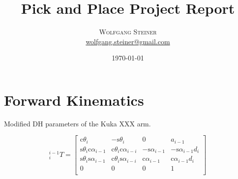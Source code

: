 \documentclass[twoside]{article}
\title{Pick and Place Project Report} %
\author{%
\textsc{Wolfgang Steiner} \\[0.5ex] %
\normalsize \href{mailto:wolfgang.steiner@gmail.com}{wolfgang.steiner@gmail.com} %
}
\date{\today} %
\renewcommand{\c}{\text{c}}
\newcommand{\s}{\text{s}}
\newcommand{\T}[2]{\mbox{$_{#2}^{#1}{T}$}}
\begin{document}
\maketitle


\section{Forward Kinematics}
\begin{table}[ht]
\caption{Modified DH parameters of the Kuka XXX arm.}
\label{tab:dh-parameters}

\end{table}

\begin{equation}
\T{i-1}{i} =
\begin{bmatrix}
  \c\theta_i & -\s\theta_i & 0 & a_{i-1} \\
  \s\theta_i\c\alpha_{i-1} & \c\theta_i\c\alpha_{i-i} & -\s\alpha_{i-1} & -\s\alpha_{i-1}d_i \\
  \s\theta_i\s\alpha_{i-1} & \c\theta_i\s\alpha_{i-i} &  \c\alpha_{i-1} &  \c\alpha_{i-1}d_i \\
  0 & 0 & 0 & 1\\
\end{bmatrix}
\end{equation}
\end{document}
